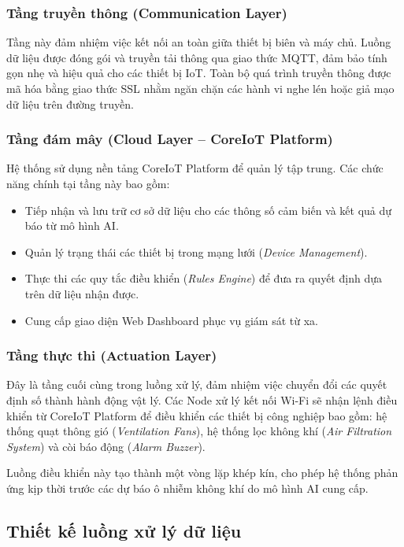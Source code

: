 \subsubsection{Tầng truyền thông (Communication Layer)}

Tầng này đảm nhiệm việc kết nối an toàn giữa thiết bị biên và máy chủ. Luồng dữ liệu được đóng gói và truyền tải thông qua giao thức MQTT, đảm bảo tính gọn nhẹ và hiệu quả cho các thiết bị IoT. Toàn bộ quá trình truyền thông được mã hóa bằng giao thức SSL nhằm ngăn chặn các hành vi nghe lén hoặc giả mạo dữ liệu trên đường truyền.

\subsubsection{Tầng đám mây (Cloud Layer -- CoreIoT Platform)}

Hệ thống sử dụng nền tảng CoreIoT Platform để quản lý tập trung. Các chức năng chính tại tầng này bao gồm:

\begin{itemize}
    \item Tiếp nhận và lưu trữ cơ sở dữ liệu cho các thông số cảm biến và kết quả dự báo từ mô hình AI.
    \item Quản lý trạng thái các thiết bị trong mạng lưới (\textit{Device Management}).
    \item Thực thi các quy tắc điều khiển (\textit{Rules Engine}) để đưa ra quyết định dựa trên dữ liệu nhận được.
    \item Cung cấp giao diện Web Dashboard phục vụ giám sát từ xa.
\end{itemize}

\subsubsection{Tầng thực thi (Actuation Layer)}

Đây là tầng cuối cùng trong luồng xử lý, đảm nhiệm việc chuyển đổi các quyết định số thành hành động vật lý. Các Node xử lý kết nối Wi-Fi sẽ nhận lệnh điều khiển từ CoreIoT Platform để điều khiển các thiết bị công nghiệp bao gồm: hệ thống quạt thông gió (\textit{Ventilation Fans}), hệ thống lọc không khí (\textit{Air Filtration System}) và còi báo động (\textit{Alarm Buzzer}).

Luồng điều khiển này tạo thành một vòng lặp khép kín, cho phép hệ thống phản ứng kịp thời trước các dự báo ô nhiễm không khí do mô hình AI cung cấp.


\subsection{Thiết kế luồng xử lý dữ liệu}

